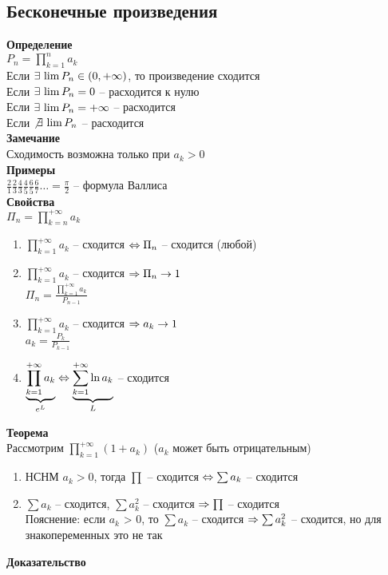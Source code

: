 \documentclass[12pt]{article}
\begin{document}
\subsection{Бесконечные произведения}
\textbf{Определение}\\
$P_n = \prod_{k=1}^n a_k$\\
Если $\ex \lim P_n \in (0, +\infty)$, то произведение сходится\\
Если $\ex \lim P_n = 0$ -- расходится к нулю\\
Если $\ex \lim P_n = +\infty$ -- расходится\\
Если $\not\ex \lim P_n$ -- расходится\\
\textbf{Замечание}\\
Сходимость возможна только при $a_k > 0$\\
\textbf{Примеры}\\
$\frac21\frac23\frac43\frac45\frac65\frac67 \ldots = \frac\pi2$ -- формула Валлиса\\
\textbf{Свойства}\\
$\Pi_n = \prod_{k=n}^{+\infty} a_k$
\begin{enumerate}
    \item $\prod_{k=1}^{+\infty} a_k$ -- сходится $\LRto \Pi_n$ -- сходится (любой)
    \item $\prod_{k=1}^{+\infty} a_k$ -- сходится $\Rto \Pi_n \rto 1$\\
    $\Pi_n = \frac{\prod_{k=1}^{+\infty} a_k}{P_{n-1}}$
    \item $\prod_{k=1}^{+\infty} a_k$ -- сходится $\Rto a_k \rto 1$\\
    $a_k = \frac{P_k}{P_{k-1}}$
    \item $\ub{e^L}{\prod_{k=1}^{+\infty} a_k} \LRto \ub{L}{\sum_{k=1}^{+\infty} \ln a_k}$ -- сходится
\end{enumerate}
\textbf{Теорема}\\
Рассмотрим $\prod_{k=1}^{+\infty} (1+a_k)$ ($a_k$ может быть отрицательным)\\
\begin{enumerate}
    \item НСНМ $a_k > 0$, тогда $\prod$ -- сходится $\LRto \sum a_k$ -- сходится
    \item $\sum a_k$ -- сходится, $\sum a_k^2$ -- сходится $\Rto \prod$ -- сходится\\
    Пояснение: если $a_k$ > 0, то $\sum a_k$ -- сходится $\Rto \sum a_k^2$ -- сходится, но для знакопеременных это не так
\end{enumerate}
\textbf{Доказательство}\\
\end{document}
